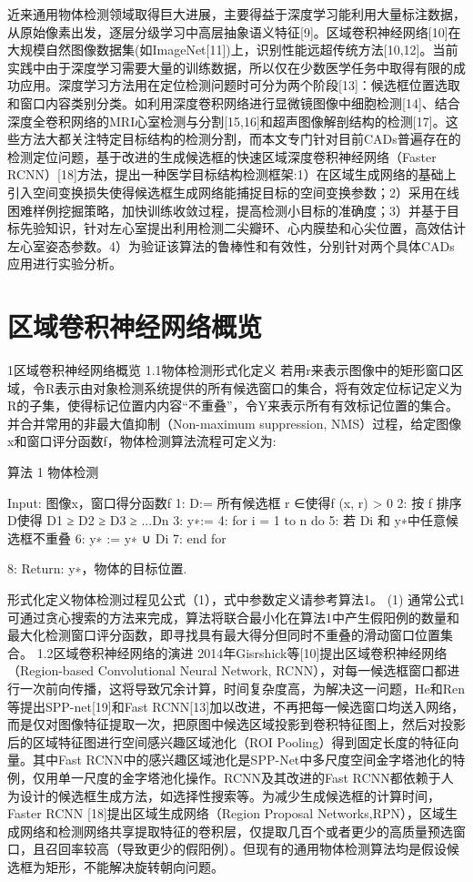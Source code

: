 近来通用物体检测领域取得巨大进展，主要得益于深度学习能利用大量标注数据，从原始像素出发，逐层分级学习中高层抽象语义特征[9]。区域卷积神经网络[10]在大规模自然图像数据集(如ImageNet[11])上，识别性能远超传统方法[10,12]。当前实践中由于深度学习需要大量的训练数据，所以仅在少数医学任务中取得有限的成功应用。深度学习方法用在定位检测问题时可分为两个阶段[13]：候选框位置选取和窗口内容类别分类。如利用深度卷积网络进行显微镜图像中细胞检测[14]、结合深度全卷积网络的MRI心室检测与分割[15,16]和超声图像解剖结构的检测[17]。这些方法大都关注特定目标结构的检测分割，而本文专门针对目前CADs普遍存在的检测定位问题，基于改进的生成候选框的快速区域深度卷积神经网络（Faster RCNN）[18]方法，提出一种医学目标结构检测框架:1）在区域生成网络的基础上引入空间变换损失使得候选框生成网络能捕捉目标的空间变换参数；2）采用在线困难样例挖掘策略，加快训练收敛过程，提高检测小目标的准确度；3）并基于目标先验知识，针对左心室提出利用检测二尖瓣环、心内膜垫和心尖位置，高效估计左心室姿态参数。4）为验证该算法的鲁棒性和有效性，分别针对两个具体CADs应用进行实验分析。

\section{区域卷积神经网络概览}
1区域卷积神经网络概览
1.1物体检测形式化定义
若用r来表示图像中的矩形窗口区域，令R表示由对象检测系统提供的所有候选窗口的集合，将有效定位标记定义为R的子集，使得标记位置内内容“不重叠”，令Y来表示所有有效标记位置的集合。并合并常用的非最大值抑制（Non-maximum suppression, NMS）过程，给定图像x和窗口评分函数f，物体检测算法流程可定义为:
 
算法 1 物体检测
 
Input: 图像x，窗口得分函数f 
1:  D:= 所有候选框 r ∈使得f (x, r) > 0
2:  按 f 排序D使得 D1 ≥ D2 ≥ D3 ≥ ...Dn
3:  y∗:= {}
4:  for i = 1 to n do
5:     若 Di 和 y∗中任意候选框不重叠
6:          y∗ := y∗ ∪ {Di }
7:  end for
 
8:  Return:  y∗，物体的目标位置.
 
形式化定义物体检测过程见公式（1），式中参数定义请参考算法1。
                               	(1)
通常公式1可通过贪心搜索的方法来完成，算法将联合最小化在算法1中产生假阳例的数量和最大化检测窗口评分函数，即寻找具有最大得分但同时不重叠的滑动窗口位置集合。
1.2区域卷积神经网络的演进
2014年Gisrshick等[10]提出区域卷积神经网络（Region-based Convolutional Neural Network, RCNN），对每一候选框窗口都进行一次前向传播，这将导致冗余计算，时间复杂度高，为解决这一问题，He和Ren等提出SPP-net[19]和Fast RCNN[13]加以改进，不再把每一候选窗口均送入网络，而是仅对图像特征提取一次，把原图中候选区域投影到卷积特征图上，然后对投影后的区域特征图进行空间感兴趣区域池化（ROI Pooling）得到固定长度的特征向量。其中Fast RCNN中的感兴趣区域池化是SPP-Net中多尺度空间金字塔池化的特例，仅用单一尺度的金字塔池化操作。RCNN及其改进的Fast RCNN都依赖于人为设计的候选框生成方法，如选择性搜索等。为减少生成候选框的计算时间，Faster RCNN [18]提出区域生成网络（Region Proposal Networks,RPN），区域生成网络和检测网络共享提取特征的卷积层，仅提取几百个或者更少的高质量预选窗口，且召回率较高（导致更少的假阳例）。但现有的通用物体检测算法均是假设候选框为矩形，不能解决旋转朝向问题。

